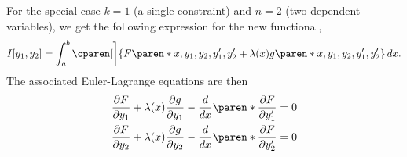 \documentclass[11pt]{penrose}
\begin{document}
For the special case $k = 1$ (a single constraint) and $n = 2$ (two dependent variables), we get the following expression for the new functional,
\begin{equation}
    I[y_1, y_2] = \int_a^b \cparen[\bigg]{F\paren*{x, y_1, y_2, y'_1, y'_2} + \lambda(x) g\paren*{x, y_1, y_2, y'_1, y'_2}} \,dx.
\end{equation}
The associated Euler-Lagrange equations are then
\begin{gather}
    \frac{\pd F}{\pd y_1} + \lambda(x)\frac{\pd g}{\pd y_1} - \frac{d}{dx} \paren*{\frac{\pd F}{\pd y'_1}} = 0\\
    \frac{\pd F}{\pd y_2} + \lambda(x)\frac{\pd g}{\pd y_2} - \frac{d}{dx} \paren*{\frac{\pd F}{\pd y'_2}} = 0
\end{gather}
\end{document}
